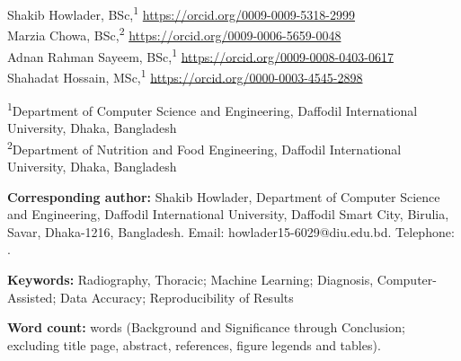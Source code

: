 \documentclass[12pt,a4paper]{article}
\begin{document}
\begin{titlepage}
\thispagestyle{empty}
\begin{singlespace}

\vspace{1.5em}
\noindent Shakib Howlader, BSc,\textsuperscript{1}
\url{https://orcid.org/0009-0009-5318-2999}\\
Marzia Chowa, BSc,\textsuperscript{2}
\url{https://orcid.org/0009-0006-5659-0048}\\
Adnan Rahman Sayeem, BSc,\textsuperscript{1}
\url{https://orcid.org/0009-0008-0403-0617}\\
Shahadat Hossain, MSc,\textsuperscript{1}
\url{https://orcid.org/0000-0003-4545-2898}

\vspace{0.8em}
\noindent\textsuperscript{1}Department of Computer Science and Engineering,
Daffodil International University, Dhaka, Bangladesh\\
\textsuperscript{2}Department of Nutrition and Food Engineering,
Daffodil International University, Dhaka, Bangladesh

\vspace{1.5em}
\noindent\textbf{Corresponding author:} Shakib Howlader,
Department of Computer Science and Engineering, Daffodil International
University, Daffodil Smart City, Birulia, Savar, \mbox{Dhaka-1216}, Bangladesh.
Email: howlader15-6029@diu.edu.bd.
Telephone: .

\vspace{1.5em}
\noindent\textbf{Keywords:} Radiography, Thoracic; Machine Learning;
Diagnosis, Computer-Assisted; Data Accuracy; Reproducibility of Results

\vspace{1.5em}
\noindent\textbf{Word count:} \unskip{} words (Background
and Significance through Conclusion; excluding title page, abstract,
references, figure legends and tables).
\end{singlespace}
\end{titlepage}
\end{document}
